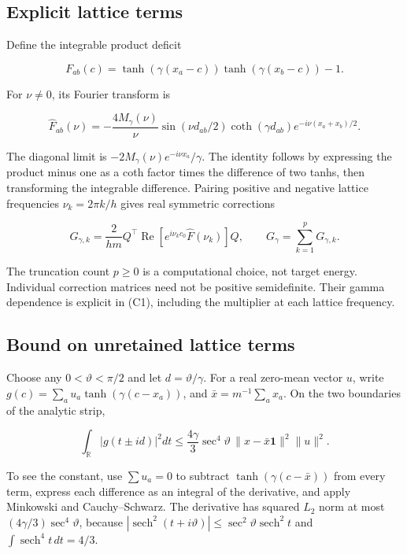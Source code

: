 \documentclass[11pt]{article}
\begin{document}
\subsection{Explicit lattice terms}

Define the integrable product deficit

\[
F_{ab}(c)=\tanh(\gamma(x_a-c))\tanh(\gamma(x_b-c))-1.
\]

For \(\nu\ne0\), its Fourier transform is

\[
\widehat F_{ab}(\nu)
=-\frac{4M_\gamma(\nu)}{\nu}
\sin(\nu d_{ab}/2)\coth(\gamma d_{ab})
e^{-i\nu(x_a+x_b)/2}.
\tag{C1}
\]

The diagonal limit is \(-2M_\gamma(\nu)e^{-i\nu x_a}/\gamma\). The identity follows by expressing the product minus one as a coth factor times the difference of two tanhs, then transforming the integrable difference. Pairing positive and negative lattice frequencies \(\nu_k=2\pi k/h\) gives real symmetric corrections

\[
G_{\gamma,k}=\frac2{hm}Q^\top
\operatorname{Re}\!\left[e^{i\nu_k c_0}\widehat F(\nu_k)\right]Q,
\qquad G_\gamma=\sum_{k=1}^{p}G_{\gamma,k}.
\tag{C2}
\]

The truncation count \(p\ge0\) is a computational choice, not target energy. Individual correction matrices need not be positive semidefinite. Their gamma dependence is explicit in (C1), including the multiplier at each lattice frequency.

\subsection{Bound on unretained lattice terms}

Choose any \(0<\vartheta<\pi/2\) and let \(d=\vartheta/\gamma\). For a real zero-mean vector \(u\), write \(g(c)=\sum_a u_a\tanh(\gamma(c-x_a))\), and \(\bar x=m^{-1}\sum_a x_a\). On the two boundaries of the analytic strip,

\[
\int_{\mathbb R}|g(t\pm id)|^2dt
\le\frac{4\gamma}{3}\sec^4\vartheta\,
\|x-\bar x\mathbf1\|^2\|u\|^2.
\tag{C3}
\]

To see the constant, use \(\sum u_a=0\) to subtract \(\tanh(\gamma(c-\bar x))\) from every term, express each difference as an integral of the derivative, and apply Minkowski and Cauchy--Schwarz. The derivative has squared \(L_2\) norm at most \((4\gamma/3)\sec^4\vartheta\), because \(|\operatorname{sech}^2(t+i\vartheta)|\le\sec^2\vartheta\operatorname{sech}^2t\) and \(\int\operatorname{sech}^4t\,dt=4/3\).
\end{document}
